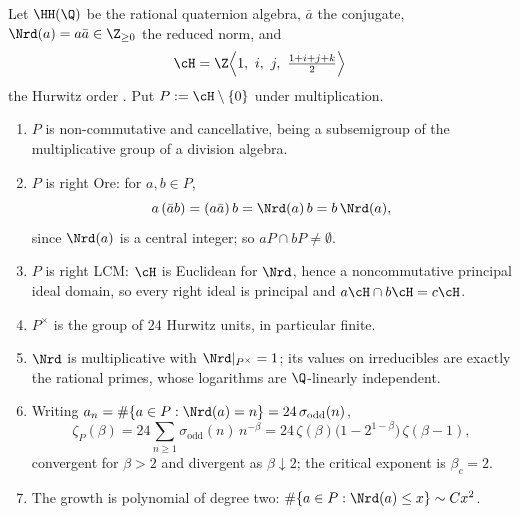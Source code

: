 Let $\HH(\Q)$ be the rational quaternion algebra, $\bar a$ the conjugate,
$\Nrd(a)=a\bar a\in\Z_{\ge0}$ the reduced norm, and
\[
\cH=\Z\Bigl\langle 1,\ i,\ j,\ \tfrac{1+i+j+k}{2}\Bigr\rangle
\]
the Hurwitz order \cite{Hurwitz,Reiner}. Put $P:=\cH\setminus\{0\}$ under multiplication.

\begin{theorem}\label{X:thm:hurwitz}
\begin{enumerate}
\item $P$ is non-commutative and cancellative, being a subsemigroup of the multiplicative
group of a division algebra.
\item $P$ is right Ore: for $a,b\in P$,
\[
a\,(\bar ab)=(a\bar a)\,b=\Nrd(a)\,b=b\,\Nrd(a),
\]
since $\Nrd(a)$ is a central integer; so $aP\cap bP\ne\emptyset$.
\item $P$ is right LCM: $\cH$ is Euclidean for $\Nrd$, hence a noncommutative principal ideal
domain, so every right ideal is principal and $a\cH\cap b\cH=c\cH$.
\item $P^\times$ is the group of $24$ Hurwitz units, in particular finite.
\item $\Nrd$ is multiplicative with $\Nrd|_{P^\times}=1$; its values on irreducibles are
exactly the rational primes, whose logarithms are $\Q$-linearly independent.
\item Writing $a_n=\#\{a\in P:\Nrd(a)=n\}=24\,\sigma_{\mathrm{odd}}(n)$,
\begin{equation}\label{X:eq:zeta}
\zeta_P(\beta)=24\sum_{n\ge1}\sigma_{\mathrm{odd}}(n)\,n^{-\beta}
=24\,\zeta(\beta)\bigl(1-2^{1-\beta}\bigr)\,\zeta(\beta-1),
\end{equation}
convergent for $\beta>2$ and divergent as $\beta\downarrow2$; the critical exponent is
$\beta_c=2$.
\item The growth is polynomial of degree two: $\#\{a\in P:\Nrd(a)\le x\}\sim Cx^2$.
\end{enumerate}
\end{theorem}

